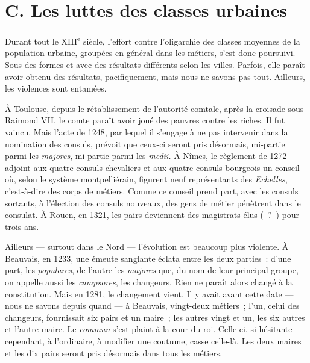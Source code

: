 \documentclass[french,twoside]{book} %
\begin{document}
\section[{C. Les luttes des classes urbaines}]{C. Les luttes des classes urbaines}
\label{c08c}
\noindent Durant tout le XIII\textsuperscript{e} siècle, l’effort contre l’oligarchie des classes moyennes de la population urbaine, groupées en général dans les métiers, s’est donc poursuivi. Sous des formes et avec des résultats différents selon les villes. Parfois, elle paraît avoir obtenu des résultats, pacifiquement, mais nous ne savons pas tout. Ailleurs, les violences sont entamées.\par
À Toulouse, depuis le rétablissement de l’autorité comtale, après la croisade sous Raimond VII, le comte paraît avoir joué des pauvres contre les riches. Il fut vaincu. Mais l’acte de 1248, par lequel il s’engage à ne pas intervenir dans la nomination des consuls, prévoit que ceux-ci seront pris désormais, mi-partie parmi les {\itshape majores}, mi-partie parmi les {\itshape medii.} À Nîmes, le règlement de 1272 adjoint aux quatre consuls chevaliers et aux quatre consuls bourgeois un conseil où, selon le système montpelliérain, figurent neuf représentants des \emph{Echelles}, c’est-à-dire des corps de métiers. Comme ce conseil prend part, avec les consuls sortants, à l’élection des consuls nouveaux, des gens de métier pénètrent dans le consulat. À Rouen, en 1321, les pairs deviennent des magistrats élus ( ? ) pour trois ans.\par
\label{p78} Ailleurs — surtout dans le Nord — l’évolution est beaucoup plus violente. À Beauvais, en 1233, une émeute sanglante éclata entre les deux parties : d’une part, les {\itshape populares}, de l’autre les {\itshape majores} que, du nom de leur principal groupe, on appelle aussi les {\itshape campsores}, les changeurs. Rien ne paraît alors changé à la constitution. Mais en 1281, le changement vient. Il y avait avant cette date — nous ne savons depuis quand — à Beauvais, vingt-deux métiers ; l’un, celui des changeurs, fournissait six pairs et un maire ; les autres vingt et un, les six autres et l’autre maire. Le \emph{commun} s’est plaint à la cour du roi. Celle-ci, si hésitante cependant, à l’ordinaire, à modifier une coutume, casse celle-là. Les deux maires et les dix pairs seront pris désormais dans tous les métiers.\par
\end{document}
